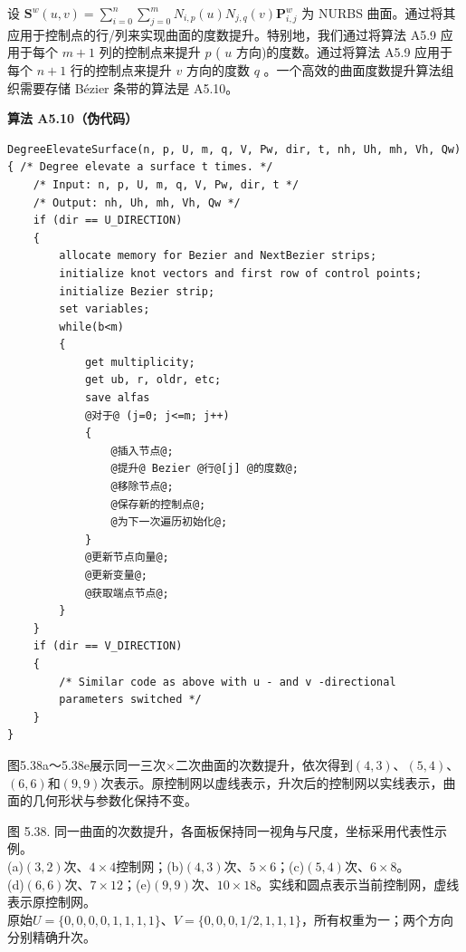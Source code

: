 \documentclass[../main.tex]{subfiles}
\begin{document}
设 \({\mathbf{S}}^{w}\left( {u,v}\right)  = \mathop{\sum }\limits_{{i = 0}}^{n}\mathop{\sum }\limits_{{j = 0}}^{m}{N}_{i,p}\left( u\right) {N}_{j,q}\left( v\right) {\mathbf{P}}_{i,j}^{w}\) 为 NURBS 曲面。通过将其应用于控制点的行/列来实现曲面的度数提升。特别地，我们通过将算法 A5.9 应用于每个 \(m + 1\) 列的控制点来提升 \(p\) ( \(u\) 方向)的度数。通过将算法 A5.9 应用于每个 \(n + 1\) 行的控制点来提升 \(v\) 方向的度数 \(q\) 。一个高效的曲面度数提升算法组织需要存储 Bézier 条带的算法是 A5.10。

\par\medskip\noindent\textbf{算法 A5.10（伪代码）}\par
\begin{verbatim}
DegreeElevateSurface(n, p, U, m, q, V, Pw, dir, t, nh, Uh, mh, Vh, Qw)
{ /* Degree elevate a surface t times. */
    /* Input: n, p, U, m, q, V, Pw, dir, t */
    /* Output: nh, Uh, mh, Vh, Qw */
    if (dir == U_DIRECTION)
    {
        allocate memory for Bezier and NextBezier strips;
        initialize knot vectors and first row of control points;
        initialize Bezier strip;
        set variables;
        while(b<m)
        {
            get multiplicity;
            get ub, r, oldr, etc;
            save alfas
            @对于@ (j=0; j<=m; j++)
            {
                @插入节点@;
                @提升@ Bezier @行@[j] @的度数@;
                @移除节点@;
                @保存新的控制点@;
                @为下一次遍历初始化@;
            }
            @更新节点向量@;
            @更新变量@;
            @获取端点节点@;
        }
    }
    if (dir == V_DIRECTION)
    {
        /* Similar code as above with u - and v -directional
        parameters switched */
    }
}
\end{verbatim}

图5.38a～5.38e展示同一三次$\times$二次曲面的次数提升，依次得到$(4,3)$、$(5,4)$、$(6,6)$和$(9,9)$次表示。原控制网以虚线表示，升次后的控制网以实线表示，曲面的几何形状与参数化保持不变。



\begin{center}
\begin{minipage}{25.5cm}
\vspace*{.6\baselineskip}
\centering
{}
\par\medskip
{}
\par\medskip
{}
\par\smallskip
图 5.38. 同一曲面的次数提升，各面板保持同一视角与尺度，坐标采用代表性示例。\\
(a)$(3,2)$次、$4\times4$控制网；(b)$(4,3)$次、$5\times6$；(c)$(5,4)$次、$6\times8$。\\
(d)$(6,6)$次、$7\times12$；(e)$(9,9)$次、$10\times18$。实线和圆点表示当前控制网，虚线表示原控制网。\\
原始$U=\{0,0,0,0,1,1,1,1\}$、$V=\{0,0,0,1/2,1,1,1\}$，所有权重为一；两个方向分别精确升次。
\end{minipage}
\end{center}
\end{document}

